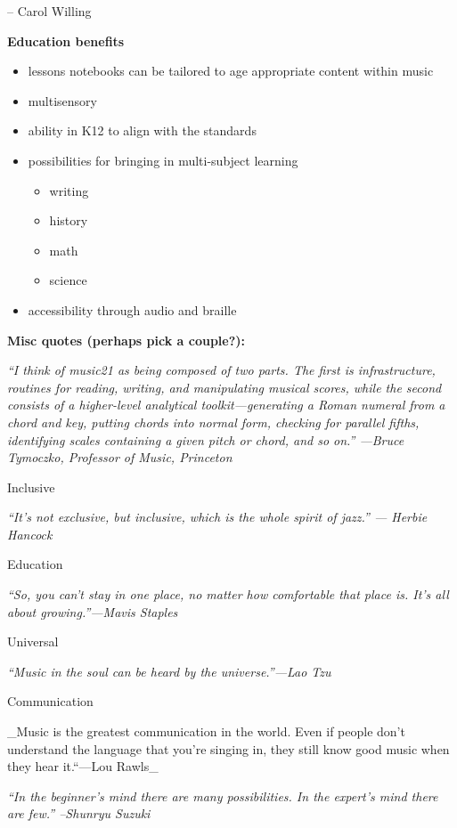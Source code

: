 \documentclass[]{book}
\providecommand{\tightlist}{%
  \setlength{\itemsep}{0pt}\setlength{\parskip}{0pt}}
\begin{document}
-- Carol Willing

\textbf{Education benefits}

\begin{itemize}
\tightlist
\item
  lessons notebooks can be tailored to age appropriate content within
  music
\item
  multisensory
\item
  ability in K12 to align with the standards
\item
  possibilities for bringing in multi-subject learning

  \begin{itemize}
  \tightlist
  \item
    writing
  \item
    history
  \item
    math
  \item
    science
  \end{itemize}
\item
  accessibility through audio and braille
\end{itemize}

\textbf{Misc quotes (perhaps pick a couple?):}

\emph{``I think of music21 as being composed of two parts. The first is
infrastructure, routines for reading, writing, and manipulating musical
scores, while the second consists of a higher-level analytical
toolkit---generating a Roman numeral from a chord and key, putting
chords into normal form, checking for parallel fifths, identifying
scales containing a given pitch or chord, and so on.'' ---Bruce
Tymoczko, Professor of Music, Princeton}

Inclusive

\emph{``It's not exclusive, but inclusive, which is the whole spirit of
jazz.'' --- Herbie Hancock}

Education

\emph{``So, you can't stay in one place, no matter how comfortable that
place is. It's all about growing.''---Mavis Staples}

Universal

\emph{``Music in the soul can be heard by the universe.''---Lao Tzu}

Communication

\_Music is the greatest communication in the world. Even if people don't
understand the language that you're singing in, they still know good
music when they hear it.``---Lou Rawls\_

\emph{``In the beginner's mind there are many possibilities. In the
expert's mind there are few.'' --Shunryu Suzuki}
\end{document}
